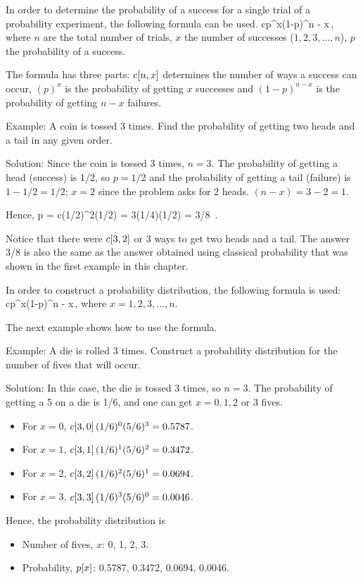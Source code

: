 In order to determine the probability of a success for a single trial of a probability experiment, the following formula can be used.
\beq
cp^x(1-p)^{n - x}\,,
\eeq
where $n$ are the total number of trials, $x$ the number of successes ($1,2,3,\dotsc,n$), $p$ the probability of a success.

The formula has three parts: $c\!\left[{n,x}\right]$ determines the number of ways a success can occur, $(p)^x$ is the probability of getting $x$ successes and $(1 - p)^{n - x}$ is the probability of getting $n - x$ failures.

Example: A coin is tossed 3 times. Find the probability of getting two heads and a tail in any given order.

Solution: Since the coin is tossed 3 times, $n = 3$. The probability of getting a head (success) is 1/2, so $p = 1/2$ and the probability of getting a tail (failure) is $1 - 1/2 = 1/2$; $x = 2$ since the problem asks for 2 heads. $(n - x) = 3 - 2 = 1$.

Hence,
\beq
p = c(1/2)^2(1/2) = 3(1/4)(1/2) = 3/8 \,.
\eeq

Notice that there were $c\!\left[{3,2}\right]$ or 3 ways to get two heads and a tail. The answer 3/8 is also the same as the answer obtained using classical probability that was shown in the first example in this chapter.

In order to construct a probability distribution, the following formula is used:
\beq
cp^x(1-p)^{n - x}\,,
\eeq
where $x = 1,2,3,\dotsc,n$. 

The next example shows how to use the formula.

Example: A die is rolled 3 times. Construct a probability distribution for the number of fives that will occur.

Solution: In this case, the die is tossed 3 times, so $n = 3$. The probability of getting a 5 on a die is 1/6, and one can get $x = 0,1,2\text{ or }3$ fives.
\begin{itemize}
\item For $x = 0$, $c\!\left[{3,0}\right](1/6)^0(5/6)^3 = 0.5787$.
\item For $x = 1$, $c\!\left[{3,1}\right](1/6)^1(5/6)^2 = 0.3472$.
\item For $x = 2$, $c\!\left[{3,2}\right](1/6)^2(5/6)^1 = 0.0694$.
\item For $x = 3$, $c\!\left[{3,3}\right](1/6)^3(5/6)^0 = 0.0046$.
\end{itemize}

Hence, the probability distribution is
\begin{itemize}
\item Number of fives, $x$: 0, 1, 2, 3.
\item Probability, $p\!\left[{x}\right]$: 0.5787, 0.3472, 0.0694, 0.0046.
\end{itemize}

